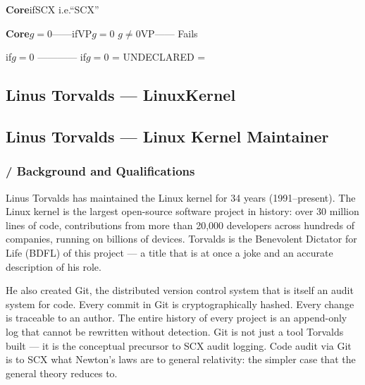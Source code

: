 \documentclass[12pt,a4paper]{article}
\theoremstyle{remark}
\begin{document}
\begin{riskbox}
\textbf{Core}ifSCX
i.e.“SCX”


\textbf{Core}$g=0$——ifVP$g=0$
$g \neq 0$VP——
Fails

\textbf{}if$g=0$
————
if$g=0$
= UNDECLARED = 
\end{riskbox}

\newpage

\subsection{Linus Torvalds — LinuxKernel}
\subsection{Linus Torvalds — Linux Kernel Maintainer}

\subsubsection{ / Background and Qualifications}

Linus Torvalds has maintained the Linux kernel for 34 years (1991–present).
The Linux kernel is the largest open-source software project in history:
over 30 million lines of code, contributions from more than 20,000 developers
across hundreds of companies, running on billions of devices. Torvalds is the
Benevolent Dictator for Life (BDFL) of this project — a title that is at once
a joke and an accurate description of his role.

He also created Git, the distributed version control system that is itself
an audit system for code. Every commit in Git is cryptographically hashed.
Every change is traceable to an author. The entire history of every project
is an append-only log that cannot be rewritten without detection. Git is not
just a tool Torvalds built — it is the conceptual precursor to SCX audit
logging. Code audit via Git is to SCX what Newton's laws are to general
relativity: the simpler case that the general theory reduces to.
\end{document}

